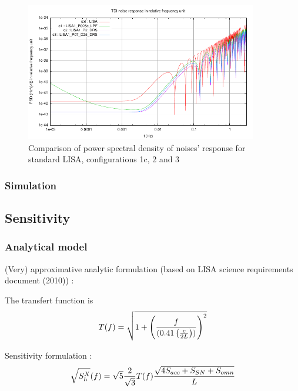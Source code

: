 \documentclass{iopart}
\begin{document}
\begin{figure}[htbp]
\begin{center}
\includegraphics[width=0.9\textwidth]{FigNoiseOrbSens/PSD-Noise_std-c1-c2-c3}
\caption{Comparison of power spectral density of noises' response for standard LISA, configurations 1c, 2 and 3}
\label{F:PSDNoiseCompC1C2C3}
\end{center}
\end{figure}



\subsubsection{Simulation}
\label{SSS:Inst:PSD:Sim}






\subsection{Sensitivity}
\label{SS:Inst:Sensitivty}

\subsubsection{Analytical model}
\label{SSS:Inst:PSD:Ana}

(Very) approximative analytic formulation (based on LISA science requirements document (2010)) : 

The transfert function is 
\begin{equation}
T(f) = \sqrt{ 1 + \left( { f \over (0.41 \left({c \over 2 L} \right) )} \right)^2 }
\label{TransfertLISA}
\end{equation}

Sensitivity formulation :
\begin{equation}
\sqrt{S^{X}_h}(f) = \sqrt{5}  {2 \over \sqrt{3}} T(f)  { \sqrt{ 4 S_{acc} + S_{SN} + S_{omn} } \over L}
\label{AppSensXLISA}
\end{equation}
\end{document}
